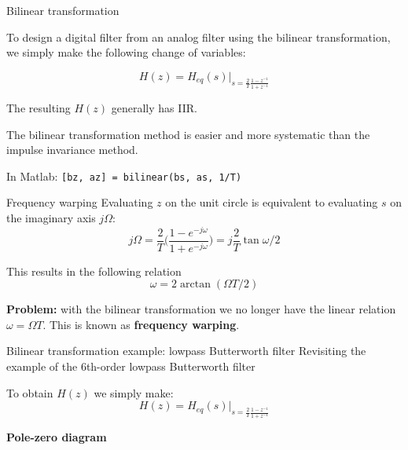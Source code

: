 \documentclass[10pt]{beamer}
\begin{document}
\begin{frame}{Bilinear transformation}

To design a digital filter from an analog filter using the bilinear transformation, we simply make the following change of variables:

\begin{equation*}
H(z) = H_{eq}(s)\bigg|_{\displaystyle s = \frac{2}{T}\frac{1 - z^{-1}}{1 + z^{-1}}}
\end{equation*}

The resulting $H(z)$ generally has IIR.
\vspace{0.25cm}

The bilinear transformation method is easier and more systematic than the impulse invariance method.
\vspace{0.25cm}

In Matlab: \texttt{[bz, az] = bilinear(bs, as, 1/T)}

\end{frame}

\begin{frame}{Frequency warping}
	Evaluating $z$ on the unit circle is equivalent to evaluating $s$ on the imaginary axis $j\Omega$:
	\begin{equation*}
j\Omega = \frac{2}{T}\bigg(\frac{1 - e^{-j\omega}}{1 + e^{-j\omega}}\bigg) = j\frac{2}{T}\tan\omega/2
\end{equation*}

This results in the following relation
\begin{equation*}
	\omega =2\arctan(\Omega T/2) \tag{frequency warping}
\end{equation*}

\textbf{Problem:} with the bilinear transformation we no longer have the linear relation $\omega = \Omega T$. This is known as \textbf{frequency warping}.

\begin{center}
	\resizebox{0.5\linewidth}{!}{}
\end{center}
\end{frame}

%
\begin{frame}{Bilinear transformation example: lowpass Butterworth filter}
Revisiting the example of the 6th-order lowpass Butterworth filter

To obtain $H(z)$ we simply make:
\begin{equation*}
H(z) = H_{eq}(s)\bigg|_{\displaystyle s = \frac{2}{T}\frac{1 - z^{-1}}{1 + z^{-1}}}
\end{equation*}

\textbf{Pole-zero diagram}
\begin{center}
	\resizebox{0.6\linewidth}{!}{}
\end{center}

\end{frame}
\end{document}
